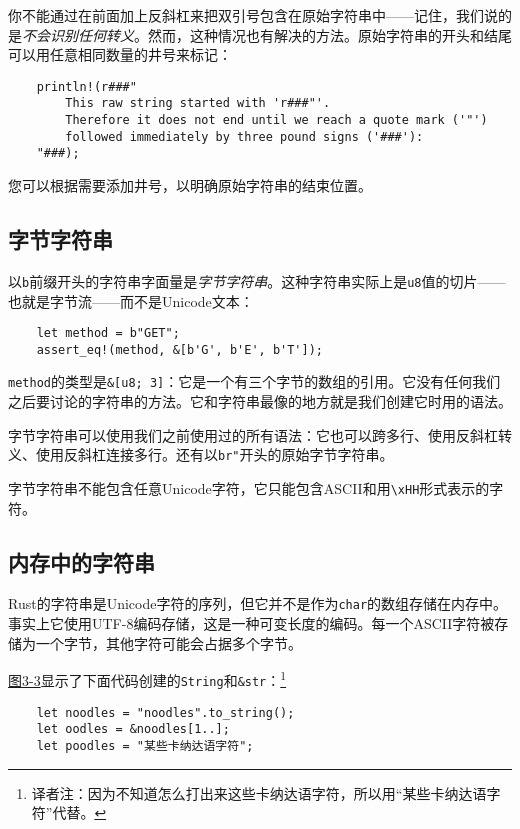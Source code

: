 你不能通过在前面加上反斜杠来把双引号包含在原始字符串中——记住，我们说的是\emph{不会识别任何转义}。然而，这种情况也有解决的方法。原始字符串的开头和结尾可以用任意相同数量的井号来标记：
\begin{verbatim}
    println!(r###"
        This raw string started with 'r###"'.
        Therefore it does not end until we reach a quote mark ('"')
        followed immediately by three pound signs ('###'):
    "###);
\end{verbatim}

您可以根据需要添加井号，以明确原始字符串的结束位置。

\subsection{字节字符串}

以\texttt{b}前缀开头的字符串字面量是\emph{字节字符串}。这种字符串实际上是\texttt{u8}值的切片——也就是字节流——而不是Unicode文本：
\begin{verbatim}
    let method = b"GET";
    assert_eq!(method, &[b'G', b'E', b'T']);
\end{verbatim}

\texttt{method}的类型是\texttt{\&[u8; 3]}：它是一个有三个字节的数组的引用。它没有任何我们之后要讨论的字符串的方法。它和字符串最像的地方就是我们创建它时用的语法。

字节字符串可以使用我们之前使用过的所有语法：它也可以跨多行、使用反斜杠转义、使用反斜杠连接多行。还有以\texttt{br"}开头的原始字节字符串。

字节字符串不能包含任意Unicode字符，它只能包含ASCII和用\texttt{\textbackslash xHH}形式表示的字符。

\subsection{内存中的字符串}

Rust的字符串是Unicode字符的序列，但它并不是作为\texttt{char}的数组存储在内存中。事实上它使用UTF-8编码存储，这是一种可变长度的编码。每一个ASCII字符被存储为一个字节，其他字符可能会占据多个字节。

\hyperref[f3-3]{图3-3}显示了下面代码创建的\texttt{String}和\texttt{\&str}：\footnote{译者注：因为不知道怎么打出来这些卡纳达语字符，所以用“某些卡纳达语字符”代替。}
\begin{verbatim}
    let noodles = "noodles".to_string();
    let oodles = &noodles[1..];
    let poodles = "某些卡纳达语字符";
\end{verbatim}

